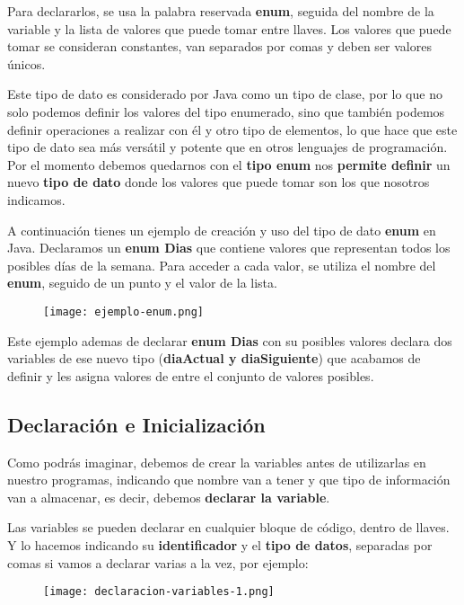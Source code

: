 Para declararlos, se usa la palabra reservada \textbf{enum}, seguida del nombre de la variable y la lista de valores que puede tomar entre llaves. Los valores que puede tomar se consideran constantes, van separados por comas y deben ser valores únicos.

Este tipo de dato es considerado por Java como un tipo de clase, por lo que no solo podemos definir los valores del tipo enumerado, sino que también podemos definir operaciones a realizar con él y otro tipo de elementos, lo que hace que este tipo de dato sea más versátil y potente que en otros lenguajes de programación. Por el momento debemos quedarnos con el \textbf{tipo enum} nos \textbf{permite definir} un nuevo \textbf{tipo de dato} donde los valores que puede tomar son los que nosotros indicamos.

A continuación tienes un ejemplo de creación y uso del tipo de dato \textbf{enum} en Java. Declaramos un \textbf{enum Dias} que contiene valores que representan todos los posibles días de la semana. Para acceder a cada valor, se utiliza el nombre del \textbf{enum}, seguido de un punto y el valor de la lista.

\begin{figure}[H]
    \texttt{[image: ejemplo-enum.png]}
\end{figure}

Este ejemplo ademas de declarar \textbf{enum Dias} con su posibles valores declara dos variables de ese nuevo tipo (\textbf{diaActual y diaSiguiente}) que acabamos de definir y les asigna valores de entre el conjunto de valores posibles.

\subsection{Declaración e Inicialización}
Como podrás imaginar, debemos de crear la variables antes de utilizarlas en nuestro programas, indicando que nombre van a tener y que tipo de información van a almacenar, es decir, debemos \textbf{declarar la variable}.

Las variables se pueden declarar en cualquier bloque de código, dentro de llaves. Y lo hacemos indicando su \textbf{identificador} y el \textbf{tipo de datos}, separadas por comas si vamos a declarar varias a la vez, por ejemplo:

\begin{figure}[H]
    \texttt{[image: declaracion-variables-1.png]}
\end{figure}

